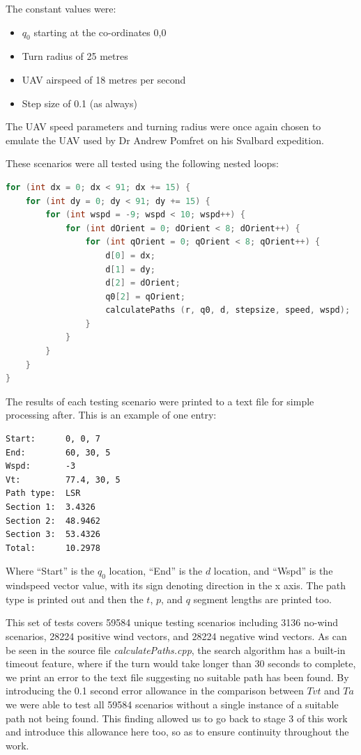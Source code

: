 The constant values were:
\begin{itemize}
 	\item $q_0$ starting at the co-ordinates 0,0
 	\item Turn radius of 25 metres
 	\item UAV airspeed of 18 metres per second
 	\item Step size of 0.1 (as always)
 \end{itemize} 

 The UAV speed parameters and turning radius were once again chosen to emulate the UAV used by Dr Andrew Pomfret on his Svalbard expedition.

These scenarios were all tested using the following nested loops:

\begin{minipage}{\linewidth}
\begin{lstlisting}[language=C++]
for (int dx = 0; dx < 91; dx += 15) {
    for (int dy = 0; dy < 91; dy += 15) {
        for (int wspd = -9; wspd < 10; wspd++) {
            for (int dOrient = 0; dOrient < 8; dOrient++) {
                for (int qOrient = 0; qOrient < 8; qOrient++) {
                    d[0] = dx;
                    d[1] = dy;
                    d[2] = dOrient;
                    q0[2] = qOrient;
                    calculatePaths (r, q0, d, stepsize, speed, wspd);
                }
            }
        }
    }
}
\end{lstlisting}
\end{minipage}

The results of each testing scenario were printed to a text file for simple processing after. This is an example of one entry:

\begin{minipage}{\linewidth}
\begin{lstlisting}[language={}]
Start: 		0, 0, 7
End: 		60, 30, 5
Wspd: 		-3
Vt:  		77.4, 30, 5
Path type: 	LSR
Section 1: 	3.4326
Section 2: 	48.9462
Section 3: 	53.4326
Total: 		10.2978
\end{lstlisting}
\end{minipage}

Where ``Start'' is the $q_0$ location, ``End'' is the $d$ location, and ``Wspd'' is the windspeed vector value, with its sign denoting direction in the x axis. The path type is printed out and then the $t$, $p$, and $q$ segment lengths are printed too. 

This set of tests covers 59584 unique testing scenarios including 3136 no-wind scenarios, 28224 positive wind vectors, and 28224 negative wind vectors. As can be seen in the source file \textit{calculatePaths.cpp}, the search algorithm has a built-in timeout feature, where if the turn would take longer than 30 seconds to complete, we print an error to the text file suggesting no suitable path has been found. By introducing the 0.1 second error allowance in the comparison between $Tvt$ and $Ta$ we were able to test all 59584 scenarios without a single instance of a suitable path not being found. This finding allowed us to go back to stage 3 of this work and introduce this allowance here too, so as to ensure continuity throughout the work. 

